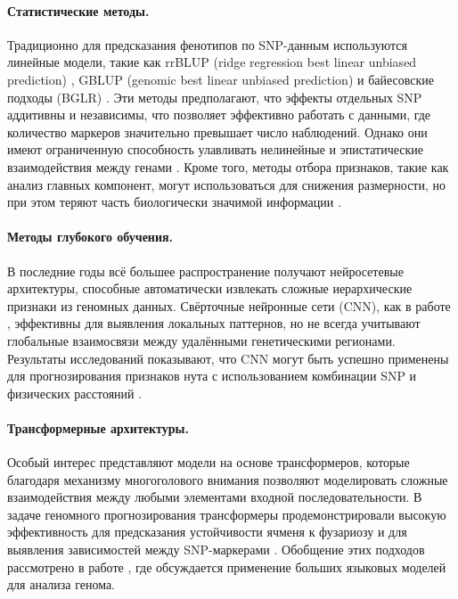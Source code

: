 \paragraph{Статистические методы.}
Традиционно для предсказания фенотипов по SNP-данным используются линейные модели, такие как rrBLUP (ridge regression best linear unbiased prediction) \cite{Endelman2011}, GBLUP (genomic best linear unbiased prediction) и байесовские подходы (BGLR) \cite{Perez2014}. Эти методы предполагают, что эффекты отдельных SNP аддитивны и независимы, что позволяет эффективно работать с данными, где количество маркеров значительно превышает число наблюдений. Однако они имеют ограниченную способность улавливать нелинейные и эпистатические взаимодействия между генами \cite{Crossa2017}. Кроме того, методы отбора признаков, такие как анализ главных компонент, могут использоваться для снижения размерности, но при этом теряют часть биологически значимой информации \cite{Manthena2022}.

\paragraph{Методы глубокого обучения.}
В последние годы всё большее распространение получают нейросетевые архитектуры, способные автоматически извлекать сложные иерархические признаки из геномных данных. Свёрточные нейронные сети (CNN), как в работе \cite{Ji2024}, эффективны для выявления локальных паттернов, но не всегда учитывают глобальные взаимосвязи между удалёнными генетическими регионами. Результаты исследований показывают, что CNN могут быть успешно применены для прогнозирования признаков нута с использованием комбинации SNP и физических расстояний \cite{Bankin2024}.

\paragraph{Трансформерные архитектуры.}
Особый интерес представляют модели на основе трансформеров, которые благодаря механизму многоголового внимания \cite{Vaswani2017} позволяют моделировать сложные взаимодействия между любыми элементами входной последовательности. В задаче геномного прогнозирования трансформеры продемонстрировали высокую эффективность для предсказания устойчивости ячменя к фузариозу \cite{Jubair2021} и для выявления зависимостей между SNP-маркерами \cite{Wu2023}. Обобщение этих подходов рассмотрено в работе \cite{Consens2023}, где обсуждается применение больших языковых моделей для анализа генома.

